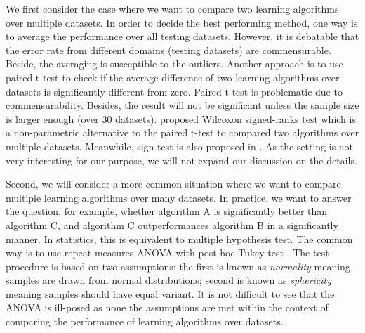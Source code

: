 {We first consider the case where we want to compare two learning algorithms over multiple datasets.
In order to decide the best performing method, one way is to average the performance over all testing datasets.
However, it is debatable that the error rate from different domains (testing datasets) are commensurable.
Beside, the averaging is susceptible to the outliers.
Another approach is to use paired t-test to check if the average difference of two learning algorithms over datasets is significantly different from zero.
Paired t-test is problematic due to commensurability.
Besides, the result will not be significant unless the sample size is larger enough (over 30 datasets).
\citet{Demsar06statistical} proposed Wilcoxon signed-ranks test which is a non-parametric alternative to the paired t-test to compared two algorithms over multiple datasets.
Meanwhile, sign-test is also proposed in \citep{Demsar06statistical}.
As the setting is not very interesting for our purpose, we will not expand our discussion on the details.

Second, we will consider a more common situation where we want to compare multiple learning algorithms over many datasets.
In practice, we want to answer the question, for example, whether algorithm A is significantly better than algorithm C, and algorithm C outperformances algorithm B in a significantly manner.
In statistics, this is equivalent to multiple hypothesis test.
The common way is to use repeat-measures ANOVA \citep{Fisher59statistical} with post-hoc Tukey test \citep{Turkey49comparing}. The test procedure is based on two assumptions: the first is known as \textit{normality} meaning samples are drawn from normal distributions; second is known as \textit{sphericity} meaning samples should have equal variant.
It is not difficult to see that the ANOVA is ill-posed as none the assumptions are met within the context of comparing the performance of learning algorithms over datasets.

}
